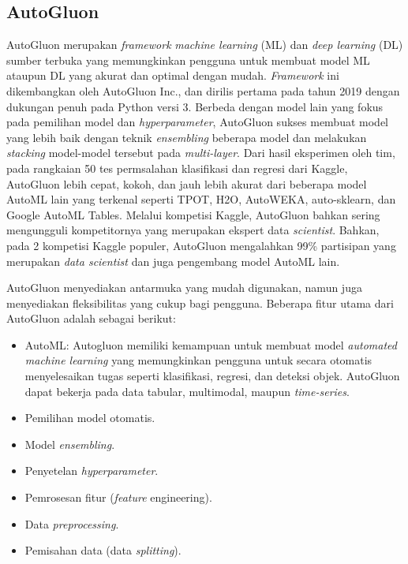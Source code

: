 \subsection{AutoGluon} \label{AutoGluon}
AutoGluon merupakan \emph{framework} \emph{machine learning} (ML) dan \emph{deep learning} (DL) sumber terbuka yang memungkinkan pengguna untuk membuat model
ML ataupun DL yang akurat dan optimal dengan mudah. \emph{Framework} ini dikembangkan oleh AutoGluon Inc., dan dirilis pertama pada tahun 2019 dengan dukungan
penuh pada Python versi 3. Berbeda dengan model lain yang fokus pada pemilihan model dan \emph{hyperparameter}, AutoGluon sukses membuat model yang lebih baik
dengan teknik \emph{ensembling} beberapa model dan melakukan \emph{stacking} model-model tersebut pada \emph{multi-layer}. Dari hasil eksperimen oleh tim, pada
rangkaian 50 tes permsalahan klasifikasi dan regresi dari Kaggle, AutoGluon lebih cepat, kokoh, dan jauh lebih akurat dari beberapa model AutoML lain yang
terkenal seperti TPOT, H2O, AutoWEKA, auto-sklearn, dan Google AutoML Tables. Melalui kompetisi Kaggle, AutoGluon bahkan sering mengungguli kompetitornya yang
merupakan ekspert data \emph{scientist}. Bahkan, pada 2 kompetisi Kaggle populer, AutoGluon mengalahkan 99\% partisipan yang merupakan \emph{data scientist}
dan juga pengembang model AutoML lain. \cite{agtabular}

AutoGluon menyediakan antarmuka yang mudah digunakan, namun juga menyediakan fleksibilitas yang cukup bagi pengguna. Beberapa fitur utama dari AutoGluon adalah
sebagai berikut:

\begin{itemize}
	\item AutoML: Autogluon memiliki kemampuan untuk membuat model \emph{automated machine learning} yang memungkinkan pengguna untuk secara otomatis menyelesaikan tugas
	      seperti klasifikasi, regresi, dan deteksi objek. AutoGluon dapat bekerja pada data tabular, multimodal, maupun \emph{time-series}.
	\item Pemilihan model otomatis.
	\item Model \emph{ensembling}.
	\item Penyetelan \emph{hyperparameter}.
	\item Pemrosesan fitur (\emph{feature} engineering).
	\item Data \emph{preprocessing}.
	\item Pemisahan data (data \emph{splitting}).
\end{itemize}

